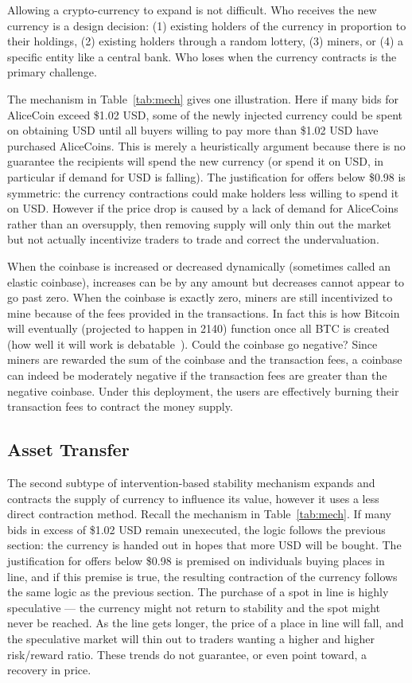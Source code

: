 Allowing a crypto-currency to expand is not difficult. Who receives the new currency is a design decision: (1) existing holders of the currency in proportion to their holdings, (2) existing holders through a random lottery, (3) miners, or (4) a specific entity like a central bank. Who loses when the currency contracts is the primary challenge.

The mechanism in Table~\ref{tab:mech} gives one illustration. Here if many bids for AliceCoin exceed \$1.02 USD, some of the newly injected currency could be spent on obtaining USD until all buyers willing to pay more than \$1.02 USD have purchased AliceCoins. This is merely a heuristically argument because there is no guarantee the recipients will spend the new currency (or spend it on USD, in particular if demand for USD is falling). The justification for offers below \$0.98 is symmetric: the currency contractions could make holders less willing to spend it on USD. However if the price drop is caused by a lack of demand for AliceCoins rather than an oversupply, then removing supply will only thin out the market but not actually incentivize traders to trade and correct the undervaluation.

When the coinbase is increased or decreased dynamically (sometimes called an elastic coinbase), increases can be by any amount but decreases cannot appear to go past zero. When the coinbase is exactly zero, miners are still incentivized to mine because of the fees provided in the transactions. In fact this is how Bitcoin will eventually (projected to happen in 2140) function once all BTC is created (how well it will work is debatable~\cite{carlsten2016instability}). Could the coinbase go negative? Since miners are rewarded the sum of the coinbase and the transaction fees, a coinbase can indeed be moderately negative if the transaction fees are greater than the negative coinbase. Under this deployment, the users are effectively burning their transaction fees to contract the money supply.


\subsection{Asset Transfer}
\label{sec:basecoin}

The second subtype of intervention-based stability mechanism expands and contracts the supply of currency to influence its value, however it uses a less direct contraction method. Recall the mechanism in Table~\ref{tab:mech}. If many bids in excess of \$1.02 USD remain unexecuted, the logic follows the previous section: the currency is handed out in hopes that more USD will be bought. The justification for offers below \$0.98 is premised on individuals buying places in line, and if this premise is true, the resulting contraction of the currency follows the same logic as the previous section. The purchase of a spot in line is highly speculative --- the currency might not return to stability and the spot might never be reached. As the line gets longer, the price of a place in line will fall, and the speculative market will thin out to traders wanting a higher and higher risk/reward ratio. These trends do not guarantee, or even point toward, a recovery in price. 

